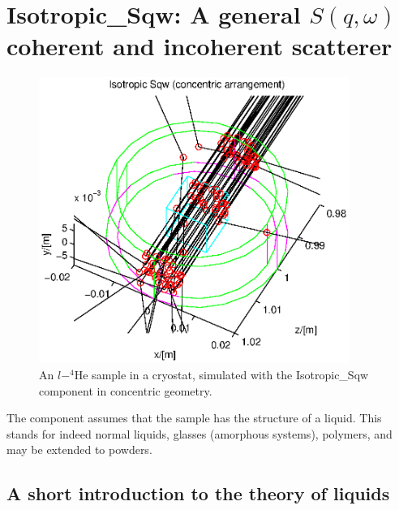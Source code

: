 \section{Isotropic\_Sqw: A general $S(q,\omega)$ coherent and incoherent scatterer}
\label{s:isotropic-sqw}


\begin{figure}
  \begin{center}
    \includegraphics[width=0.9\textwidth]{figures/sqw.eps}
  \end{center}
\caption{An $l-^4$He sample in a cryostat, simulated with the Isotropic\_Sqw component in concentric geometry.}
\label{f:isotropic-sqw}
\end{figure}

The component assumes that the sample has the structure of a liquid. This stands for indeed normal liquids, glasses (amorphous systems), polymers, and may be extended to powders.

\subsection{A short introduction to the theory of liquids}

